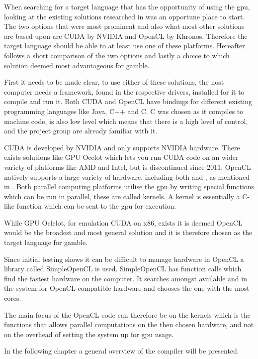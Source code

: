 When searching for a target language that has the opportunity of using the \acrshort{gpu}, looking at the existing solutions researched in  was an opportune place to start.
The two options that were most prominent and also what most other solutions are based upon are CUDA by NVIDIA and OpenCL by Khronos.
Therefore the target language should be able to at least use one of these platforms. 
Hereafter follows a short comparison of the two options and lastly a choice to which solution deemed most advantageous for \gls{gamble}.

First it needs to be made clear, to use either of these solutions, the host computer needs a framework, found in the respective drivers, installed for it to compile and run it. 
Both CUDA and OpenCL have bindings for different existing programming languages like Java, C++ and C.
C was chosen as it compiles to machine code, is also low level which means that there is a high level of control, and the project group are already familiar with it. 

CUDA is developed by NVIDIA and only supports NVIDIA hardware.
There exists solutions like GPU Ocelot which lets you run CUDA code on an wider variety of platforms like AMD and Intel, but is discontinued since 2011. \citep{Diamos:2010:ODO:1854273.1854318}
OpenCL natively supports a large variety of hardware, including both  and , as mentioned in .
Both parallel computing platforms utilise the \acrshort{gpu} by writing special functions which can be run in parallel, these are called kernels.
A kernel is essentially a C-like function which can be sent to the \acrshort{gpu} for execution.

While GPU Oclelot, for emulation CUDA on x86, exists it is deemed OpenCL would be the broadest and most general solution and it is therefore chosen as the target language for \gls{gamble}.

Since initial testing shows it can be difficult to manage hardware in OpenCL a library called SimpleOpenCL is used.
SimpleOpenCL has function calls which find the fastest hardware on the computer.
It searches amongst available  and  in the system for OpenCL compatible hardware and chooses the one with the most cores. \citep{simpleCL}

The main focus of the OpenCL code can therefore be on the kernels which is the functions that allows parallel computations on the then chosen hardware, and not on the overhead of setting the system up for \acrshort{gpu} usage.

In the following chapter a general overview of the compiler will be presented.
